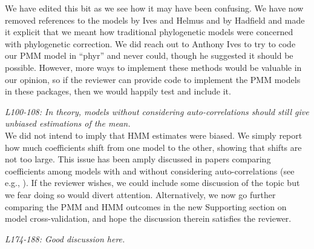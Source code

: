 \documentclass[11pt]{article}
\begin{document}
We have edited this bit as we see how it may have been confusing. We have now removed references to the models by Ives and Helmus and by Hadfield and made it explicit that we meant how traditional phylogenetic models were concerned with phylogenetic correction. We did reach out to Anthony Ives to try to code our PMM model in ``phyr'' and never could, though he suggested it should be possible. However, more ways to implement these methods would be valuable in our opinion, so if the reviewer can provide code to implement the PMM models in these packages, then we would happily test and include it.


\emph{L100-108: In theory, models without considering auto-correlations should still give unbiased estimations of the mean.}\\

We did not intend to imply that HMM estimates were biased. We simply report how much coefficients shift from one model to the other, showing that shifts are not too large. This issue has been amply discussed in papers comparing coefficients among models with and without considering auto-correlations (see e.g., \cite{mauricio2009coefficient}). If the reviewer wishes, we could include some discussion of the topic but we fear doing so would divert attention. Alternatively, we now go further comparing the PMM and HMM outcomes in the new Supporting section on model cross-validation, and hope the discussion therein satisfies the reviewer. 


\emph{L174-188: Good discussion here.}\\
\end{document}
